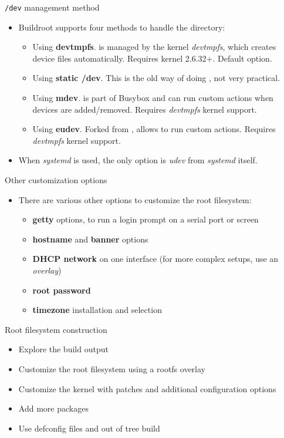 \begin{frame}{{\tt /dev} management method}
  \begin{itemize}
  \item Buildroot supports four methods to handle the 
    directory:
    \begin{itemize}
    \item Using {\bf devtmpfs}.  is managed by the kernel
      {\em devtmpfs}, which creates device files
      automatically. Requires kernel 2.6.32+. Default option.
    \item Using {\bf static /dev}. This is the old way of doing
      , not very practical.
    \item Using {\bf mdev}.  is part of Busybox and can run
      custom actions when devices are added/removed. Requires {\em
        devtmpfs} kernel support.
    \item Using {\bf eudev}. Forked from , allows to run
      custom actions. Requires {\em devtmpfs} kernel support.
    \end{itemize}
  \item When {\em systemd} is used, the only option is {\em udev} from
    {\em systemd} itself.
  \end{itemize}
\end{frame}

\begin{frame}{Other customization options}
  \begin{itemize}
  \item There are various other options to customize the root
    filesystem:
    \begin{itemize}
    \item {\bf getty} options, to run a login prompt on a serial port
      or screen
    \item {\bf hostname} and {\bf banner} options
    \item {\bf DHCP network} on one interface (for more complex
      setups, use an {\em overlay})
    \item {\bf root password}
    \item {\bf timezone} installation and selection
    \end{itemize}
  \end{itemize}
\end{frame}

\setuplabframe
{Root filesystem construction}
{
  \begin{itemize}
  \item Explore the build output
  \item Customize the root filesystem using a rootfs overlay
  \item Customize the kernel with patches and additional configuration
    options
  \item Add more packages
  \item Use defconfig files and out of tree build
  \end{itemize}
}
